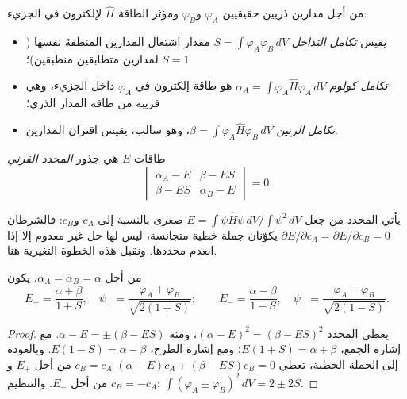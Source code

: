 \begin{definition}\label{def:b2:diatomic-mos:integrals}
من أجل مدارين ذريين حقيقيين $\varphi_A$ و$\varphi_B$ ومؤثر الطاقة $\hat H$
لإلكترون في الجزيء:
\begin{itemize}
  \item يقيس \emph{تكامل التداخل} $S = \int\varphi_A\varphi_B\,dV$
        مقدار اشتغال المدارين المنطقةَ نفسها ($S = 1$ لمدارين
        متطابقين منطبقين)؛
  \item \emph{تكامل كولوم} $\alpha_A = \int\varphi_A\hat
        H\varphi_A\,dV$ هو طاقة إلكترون في $\varphi_A$ داخل الجزيء،
        وهي قريبة من طاقة المدار الذري؛
  \item \emph{تكامل الرنين} $\beta = \int\varphi_A\hat
        H\varphi_B\,dV$، وهو سالب، يقيس اقتران المدارين.
\end{itemize}
طاقات  $E$ هي جذور \emph{المحدد
القرني}
\[
  \begin{vmatrix} \alpha_A - E & \beta - ES \\ \beta - ES & \alpha_B - E \end{vmatrix} = 0 .
\]
\end{definition}

يأتي المحدد من جعل $E = \int\psi\hat H\psi\,dV/\int\psi^2\,dV$ صغرى
بالنسبة إلى $c_A$ و$c_B$: فالشرطان $\partial E/\partial c_A =
\partial E/\partial c_B = 0$ يكوّنان جملة خطية متجانسة، ليس لها حل غير معدوم
إلا إذا انعدم محددها. ونقبل هذه الخطوة التغيرية
هنا.

\begin{theorem}\label{thm:b2:diatomic-mos:homonuclear}
من أجل $\alpha_A = \alpha_B = \alpha$، يكون 
\[
  E_+ = \frac{\alpha + \beta}{1 + S}, \quad \psi_+ = \frac{\varphi_A + \varphi_B}{\sqrt{2(1 + S)}} ;
  \qquad
  E_- = \frac{\alpha - \beta}{1 - S}, \quad \psi_- = \frac{\varphi_A - \varphi_B}{\sqrt{2(1 - S)}} .
\]
\end{theorem}

\begin{proof}
يعطي المحدد $(\alpha - E)^2 = (\beta - ES)^2$، ومنه $\alpha - E = \pm(\beta - ES)$.
مع إشارة الجمع، $E(1 + S) = \alpha + \beta$؛ ومع إشارة الطرح، $E(1 - S) = \alpha
- \beta$. وبالعودة إلى الجملة الخطية، تعطي $(\alpha - E)c_A + (\beta - ES)c_B = 0$ $c_B
= c_A$ من أجل $E_+$ و$c_B = -c_A$ من أجل $E_-$. والتنظيم: $\int(\varphi_A \pm
\varphi_B)^2\,dV = 2 \pm 2S$.
\end{proof}

